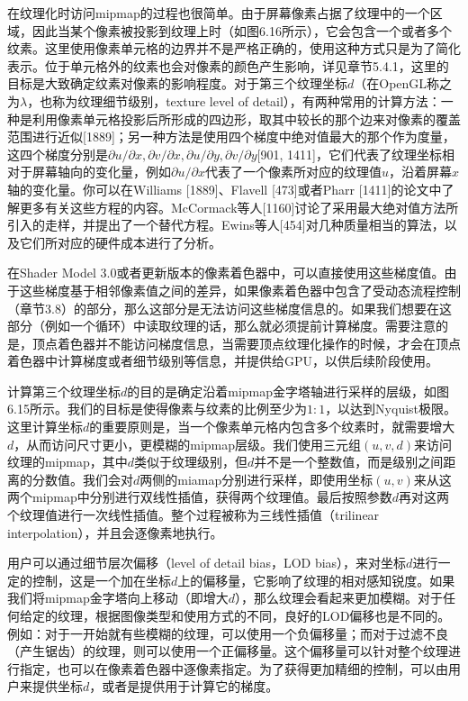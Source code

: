 \documentclass[
  paper=a4,
  ,captions=tableheading
]{scrartcl}
\begin{document}
在纹理化时访问mipmap的过程也很简单。由于屏幕像素占据了纹理中的一个区域，因此当某个像素被投影到纹理上时（如图6.16所示），它会包含一个或者多个纹素。这里使用像素单元格的边界并不是严格正确的，使用这种方式只是为了简化表示。位于单元格外的纹素也会对像素的颜色产生影响，详见章节5.4.1，这里的目标是大致确定纹素对像素的影响程度。对于第三个纹理坐标\(d\)（在OpenGL称之为\(\lambda\)，也称为纹理细节级别，texture
level of
detail），有两种常用的计算方法：一种是利用像素单元格投影后所形成的四边形，取其中较长的那个边来对像素的覆盖范围进行近似{[}1889{]}；另一种方法是使用四个梯度中绝对值最大的那个作为度量，这四个梯度分别是\(\partial u / \partial x, \partial v / \partial x,\partial u / \partial y,\partial v / \partial y\){[}901,
1411{]}，它们代表了纹理坐标相对于屏幕轴向的变化量，例如\(\partial u / \partial x\)代表了一个像素所对应的纹理值\(u\)，沿着屏幕\(x\)轴的变化量。你可以在Williams
{[}1889{]}、Flavell {[}473{]}或者Pharr
{[}1411{]}的论文中了解更多有关这些方程的内容。McCormack等人{[}1160{]}讨论了采用最大绝对值方法所引入的走样，并提出了一个替代方程。Ewins等人{[}454{]}对几种质量相当的算法，以及它们所对应的硬件成本进行了分析。

在Shader Model
3.0或者更新版本的像素着色器中，可以直接使用这些梯度值。由于这些梯度基于相邻像素值之间的差异，如果像素着色器中包含了受动态流程控制（章节3.8）的部分，那么这部分是无法访问这些梯度信息的。如果我们想要在这部分（例如一个循环）中读取纹理的话，那么就必须提前计算梯度。需要注意的是，顶点着色器并不能访问梯度信息，当需要顶点纹理化操作的时候，才会在顶点着色器中计算梯度或者细节级别等信息，并提供给GPU，以供后续阶段使用。

计算第三个纹理坐标\(d\)的目的是确定沿着mipmap金字塔轴进行采样的层级，如图6.15所示。我们的目标是使得像素与纹素的比例至少为\(1:1\)，以达到Nyquist极限。这里计算坐标\(d\)的重要原则是，当一个像素单元格内包含多个纹素时，就需要增大\(d\)，从而访问尺寸更小，更模糊的mipmap层级。我们使用三元组\((u, v, d)\)来访问纹理的mipmap，其中\(d\)类似于纹理级别，但\(d\)并不是一个整数值，而是级别之间距离的分数值。我们会对\(d\)两侧的miamap分别进行采样，即使用坐标\((u, v)\)来从这两个mipmap中分别进行双线性插值，获得两个纹理值。最后按照参数\(d\)再对这两个纹理值进行一次线性插值。整个过程被称为三线性插值（trilinear
interpolation），并且会逐像素地执行。

用户可以通过细节层次偏移（level of detail bias，LOD
bias），来对坐标\(d\)进行一定的控制，这是一个加在坐标\(d\)上的偏移量，它影响了纹理的相对感知锐度。如果我们将mipmap金字塔向上移动（即增大\(d\)），那么纹理会看起来更加模糊。对于任何给定的纹理，根据图像类型和使用方式的不同，良好的LOD偏移也是不同的。例如：对于一开始就有些模糊的纹理，可以使用一个负偏移量；而对于过滤不良（产生锯齿）的纹理，则可以使用一个正偏移量。这个偏移量可以针对整个纹理进行指定，也可以在像素着色器中逐像素指定。为了获得更加精细的控制，可以由用户来提供坐标\(d\)，或者是提供用于计算它的梯度。
\end{document}
